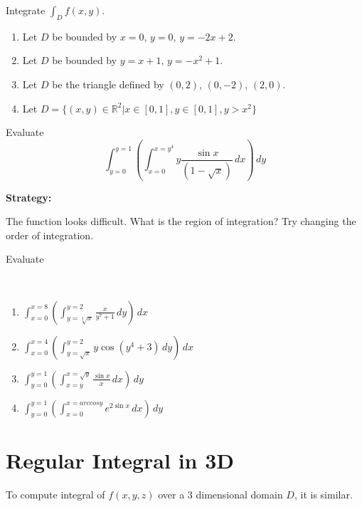 \documentclass[11pt,fleqn]{book} %
\begin{document}
\begin{exercise}
    Integrate $\int_D f(x, y)$. 

    \begin{enumerate}
        \item Let $D$ be bounded by $x = 0$, $y = 0$, $y = -2x + 2$. 
        \item Let $D$ be bounded by $y = x + 1$, $y = -x^2 + 1$.
        \item Let $D$ be the triangle defined by $(0, 2)$, $(0, -2)$, $(2, 0)$.
        \item Let $D = \{ (x, y) \in \mathbb{R}^2 | x \in [0, 1], y \in [0, 1], y > x^2 \}$
    \end{enumerate}
\end{exercise}

\begin{exercise}
    Evaluate $$\int_{y=0}^{y=1} \left( \int_{x=0}^{x=y^4} y \frac{\sin{x}}{(1 - \sqrt{x})} \,dx \right) \,dy$$

    \textbf{Strategy:}

    The function looks difficult. What is the region of integration? Try changing the order of integration.
\end{exercise}

\begin{exercise}
    Evaluate

    {~~~}

    \begin{enumerate}
        \item $\int_{x=0}^{x=8} \left( \int_{y=\sqrt[3]{x}}^{y=2} \frac{x}{y^7 +1} \,dy \right) \,dx$
        \item $\int_{x=0}^{x=4} \left( \int_{y=\sqrt{x}}^{y=2} y \cos(y^4 + 3) \,dy \right) \,dx$
        \item $\int_{y=0}^{y=1} \left( \int_{x=y}^{x=\sqrt{y}} \frac{\sin{x}}{x} \,dx \right) \,dy$
        \item $\int_{y=0}^{y=1} \left( \int_{x=0}^{x=arccos{y}} e^{2\sin{x}} \,dx \right) \,dy$
    \end{enumerate}
\end{exercise}

\section{Regular Integral in 3D}

To compute integral of $f(x,y,z)$ over a 3 dimensional domain $D$, it is similar.
\end{document}
